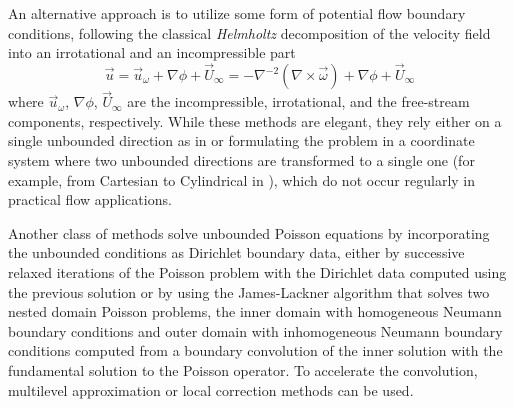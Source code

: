 \documentclass[final,1p,times]{elsarticle}
\begin{document}
An alternative approach is to utilize some form of potential flow boundary conditions, following the classical \emph{Helmholtz} decomposition of the velocity field into an irrotational and an incompressible part
\begin{equation}\label{eq:u_vort}
    \vec{u} = \vec{u}_\omega + \nabla\phi + \vec{U}_\infty = -\nabla^{-2}\left(\nabla \times \vec{\omega}\right) + \nabla\phi + \vec{U}_\infty
\end{equation}
where $\vec{u}_\omega$, $\nabla\phi$, $\vec{U}_\infty$ are the incompressible, irrotational, and the free-stream components, respectively. While these methods are elegant, they rely either on a single unbounded direction as in \cite{Grosch1977NumericalTransforms} or formulating the problem in a coordinate system where two unbounded directions are transformed to a single one (for example, from Cartesian to Cylindrical in \cite{Levy2022SolvingMethod}), which do not occur regularly in practical flow applications.

Another class of methods solve unbounded Poisson equations by incorporating the unbounded conditions as Dirichlet boundary data, either by successive relaxed iterations of the Poisson problem with the Dirichlet data computed using the previous solution \cite{Miller2008AnBoundaries} or by using the James-Lackner \cite{Jamb1977TheDistributions, Lackner1976COMPUTATIONEQUILIBRIA} algorithm that solves two nested domain Poisson problems, the inner domain with homogeneous Neumann boundary conditions and outer domain with inhomogeneous Neumann boundary conditions computed from a boundary convolution of the inner solution with the fundamental solution to the Poisson operator. To accelerate the convolution, multilevel approximation \cite{Mccorquodale2006ADimensions} or local correction methods \cite{Kavouklis2019ComputationCorrections} can be used.
\end{document}
